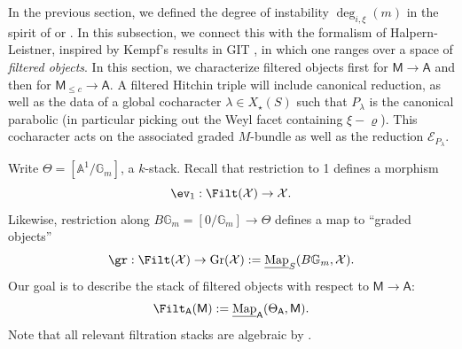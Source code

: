 \documentclass[openany]{amsbook}
\theoremstyle{definition}
\theoremstyle{remark}
\numberwithin{equation}{section}
\newcommand{\G}{\mathbb{G}}
\newcommand{\cE}{\mathcal{E}}
\newcommand{\cX}{\mathcal{X}}
\newcommand{\A}{\mathbb{A}}
\newcommand{\ul}[1]{\underline{#1}}
\renewcommand{\-}{\operatorname{-}}
\newcommand{\Map}{\ul{\operatorname{Map}}}
\newcommand{\on}[1]{\operatorname{#1}}
\renewcommand{\A}{\mathbb{A}}
\newcommand{\bM}{\mathsf{M}}
\newcommand{\bA}{\mathsf{A}}
\newcommand{\Gr}{\on{Gr}}
\begin{document}
In the previous section, we defined the degree of instability $\deg_{i, \xi}(m)$ in the spirit of \cite{behrendthesis} or \cite{CLI}. In this subsection, we connect this with the formalism of Halpern-Leistner, inspired by Kempf's results in GIT \cite{kempf}, in which one ranges over a space of \emph{filtered objects}. In this section, we characterize filtered objects first for $\bM \to \bA$ and then for $\bM_{\le c} \to \bA$. A filtered Hitchin triple will include canonical reduction, as well as the data of a global cocharacter $\lambda \in X_\star(S)$ such that $P_\lambda$ is the canonical parabolic (in particular picking out the Weyl facet containing $\xi - \varrho$). This cocharacter acts on the associated graded $M$-bundle as well as the reduction $\cE_{P_\lambda}$. 

Write $\Theta = [\A^1/\G_m]$, a $k$-stack. Recall that restriction to 1 defines a morphism
    \[
        \ev_1 : \Filt(\cX) \to \cX.
    \]
    Likewise, restriction along $B\G_m = [0/\G_m] \to \Theta$ defines a map to ``graded objects''
    \[
        \gr : \Filt(\cX) \to \Gr(\cX) := \Map_S(B\G_m, \cX).
    \]Our goal is to describe the stack of filtered objects with respect to $\bM \to \bA$:
\[
    \Filt_{\bA}(\bM) := \Map_{\bA}(\Theta_{\bA}, \bM).
\]
Note that all relevant filtration stacks are algebraic by \cite[Prop. 1.1.2]{HalpernLeistnerInstability}.
\end{document}
